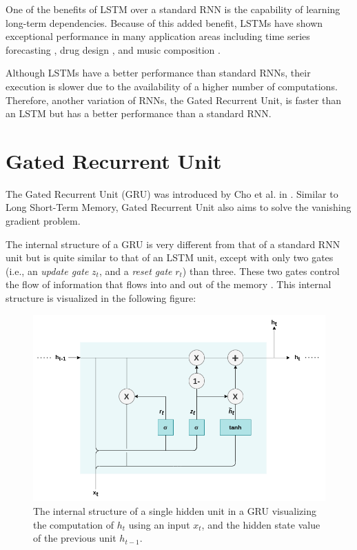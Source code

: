 One of the benefits of LSTM over a standard RNN is the capability of learning long-term dependencies. Because of this added benefit, LSTMs have shown exceptional performance in many application areas including time series forecasting \cite{lstm_time}, drug design \cite{lstm_drug}, and music composition \cite{lstm_music}.

Although LSTMs have a better performance than standard RNNs, their execution is slower due to the availability of a higher number of computations. Therefore, another variation of RNNs, the Gated Recurrent Unit, is faster than an LSTM but has a better performance than a standard RNN.


\newpage
\section{Gated Recurrent Unit}\label{section:gru}

The Gated Recurrent Unit (GRU) was introduced by Cho et al. in \cite{gru}. Similar to Long Short-Term Memory, Gated Recurrent Unit also aims to solve the vanishing gradient problem.

The internal structure of a GRU is very different from that of a standard RNN unit but is quite similar to that of an LSTM unit, except with only two gates (i.e., an \textit{update gate} $z_t$, and a \textit{reset gate} $r_t$) than three. These two gates control the flow of information that flows into and out of the memory \cite{gru_gates}. This internal structure is visualized in the following figure:

\begin{figure}[h]
	\centering
	\includegraphics[width=0.8\linewidth]{images/background/gru_unit.png}
	\caption[Internal structure of a single hidden unit in a GRU]%
	{The internal structure of a single hidden unit in a GRU visualizing the computation of $h_t$ using an input $x_t$, and the hidden state value of the previous unit $h_{t-1}$.}
	\label{fig:gru_unit}
\end{figure}

